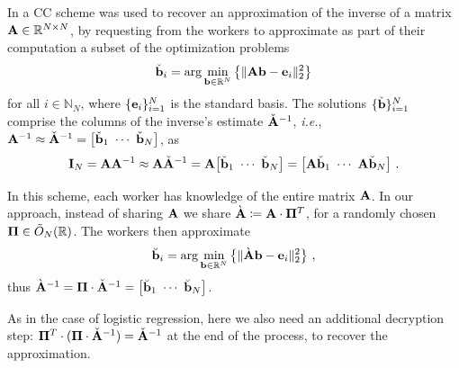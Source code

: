\documentclass[journal,letterpaper,onecolumn,twoside,nofonttune]{IEEEtran}
\newcommand{\Otil}{\tilde{O}}
\newcommand{\Pibold}{\bold{\Pi}}
\newcommand{\R}{\mathbb{R}}
\newcommand{\N}{\mathbb{N}}
\newcommand{\Ab}{\bold{A}}
\newcommand{\Abc}{{\check{\bold{A}}}}
\newcommand{\Abg}{{\grave{\bold{A}}}}
\newcommand{\bb}{\bold{b}}
\newcommand{\bbbr}{\breve{\bold{b}}}
\newcommand{\bbc}{{\check{\bold{b}}}}
\newcommand{\eb}{\bold{e}}
\newcommand{\Ib}{\bold{I}}
\begin{document}
In \cite{CPH20b} a CC scheme was used to recover an approximation of the inverse of a matrix $\Ab\in\R^{N\times N}$, by requesting from the workers to approximate as part of their computation a subset of the optimization problems
\begin{equation}
  \bbc_i = \arg\min_{\bb\in\R^N} \big\{\|\Ab\bb-\eb_i\|_2^2\big\}
\end{equation}
for all $i\in\N_N$, where $\{\eb_i\}_{i=1}^N$ is the standard basis. The solutions $\{\bbc\}_{i=1}^N$ comprise the columns of the inverse's estimate $\Abc^{-1}$, \textit{i.e.}, $\Ab^{-1}\approx\Abc^{-1}=\big[\bbc_1 \ \cdots \ \bbc_N \big]$, as
$$ \Ib_N = \Ab\Ab^{-1} \approx \Ab\Abc^{-1} = \Ab\big[\bbc_1 \ \cdots \ \bbc_N \big] = \big[\Ab\bbc_1 \ \cdots \ \Ab\bbc_N \big] \ . $$

In this scheme, each worker has knowledge of the entire matrix $\Ab$. In our approach, instead of sharing $\Ab$ we share $\Abg\coloneqq\Ab\cdot\Pibold^T$, for a randomly chosen $\Pibold\in\Otil_{N}(\R)$. The workers then approximate
\begin{equation}
  \bbbr_i = \arg\min_{\bb\in\R^N} \big\{\|\Abg\bb-\eb_i\|_2^2\big\} \ ,
\end{equation}
thus $\Abg^{-1}=\Pibold\cdot\Abc^{-1}=\big[\bbbr_1 \ \cdots \ \bbbr_N \big]$.

As in the case of logistic regression, here we also need an additional decryption step: $\Pibold^T\cdot(\Pibold\cdot\Abc^{-1})=\Abc^{-1}$ at the end of the process, to recover the approximation.

\end{document}
